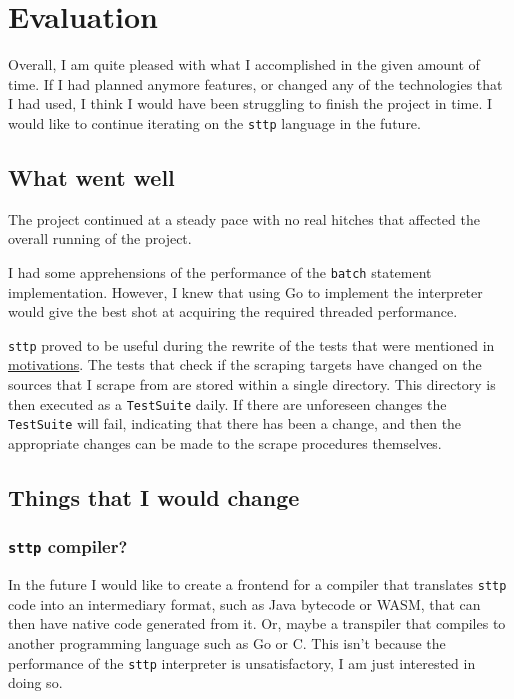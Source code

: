 \chapter{Evaluation}
\label{chap:evaluation}

Overall, I am quite pleased with what I accomplished in the given amount of time. If I had planned anymore features, or changed any of the technologies that I had used, I think I would have been struggling to finish the project in time. I would like to continue iterating on the \verb|sttp| language in the future.

\section{What went well}

The project continued at a steady pace with no real hitches that affected the overall running of the project.

I had some apprehensions of the performance of the \verb|batch| statement implementation. However, I knew that using Go to implement the interpreter would give the best shot at acquiring the required threaded performance.

\verb|sttp| proved to be useful during the rewrite of the tests that were mentioned in \hyperref[chap:motivations]{motivations}. The tests that check if the scraping targets have changed on the sources that I scrape from are stored within a single directory. This directory is then executed as a \verb|TestSuite| daily. If there are unforeseen changes the \verb|TestSuite| will fail, indicating that there has been a change, and then the appropriate changes can be made to the scrape procedures themselves.

\section{Things that I would change}

\cprotect\subsection{\verb|sttp| compiler?}

In the future I would like to create a frontend for a compiler that translates \verb|sttp| code into an intermediary format, such as Java bytecode or WASM, that can then have native code generated from it. Or, maybe a transpiler that compiles to another programming language such as Go or C. This isn't because the performance of the \verb|sttp| interpreter is unsatisfactory, I am just interested in doing so.

